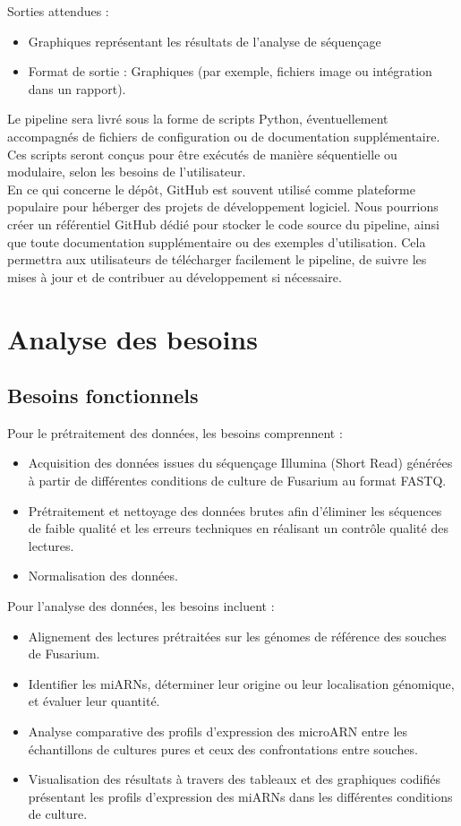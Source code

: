 \documentclass{report}
\begin{document}
\noindent Sorties attendues :
\begin{itemize}
    \item Graphiques représentant les résultats de l'analyse de séquençage
    \item Format de sortie : Graphiques (par exemple, fichiers image ou intégration dans un rapport).
\end{itemize} \vspace{.5cm}

Le pipeline sera livré sous la forme de scripts Python, éventuellement accompagnés de fichiers de configuration ou de documentation supplémentaire. Ces scripts seront conçus pour être exécutés de manière séquentielle ou modulaire, selon les besoins de l'utilisateur.\\

En ce qui concerne le dépôt, GitHub est souvent utilisé comme plateforme populaire pour héberger des projets de développement logiciel. Nous pourrions créer un référentiel GitHub dédié pour stocker le code source du pipeline, ainsi que toute documentation supplémentaire ou des exemples d'utilisation. Cela permettra aux utilisateurs de télécharger facilement le pipeline, de suivre les mises à jour et de contribuer au développement si nécessaire.

\section{Analyse des besoins}

\subsection{Besoins fonctionnels}
Pour le prétraitement des données, les besoins comprennent :
\begin{itemize}
    \item Acquisition des données issues du séquençage Illumina (Short Read) générées à partir de différentes conditions de culture de Fusarium au format FASTQ.
    \item Prétraitement et nettoyage des données brutes afin d'éliminer les séquences de faible qualité et les erreurs techniques en réalisant un contrôle qualité des lectures.
    \item Normalisation des données.
\end{itemize}

Pour l'analyse des données, les besoins incluent :  
\begin{itemize}
 \item Alignement des lectures prétraitées sur les génomes de référence des souches de Fusarium.
    \item Identifier les miARNs, déterminer leur origine ou leur localisation génomique, et évaluer leur quantité.
    \item Analyse comparative des profils d'expression des microARN entre les échantillons de cultures pures et ceux des confrontations entre souches.
    \item Visualisation des résultats à travers des tableaux et des graphiques codifiés présentant les profils d'expression des miARNs dans les différentes conditions de culture.
\end{itemize}
\end{document}
